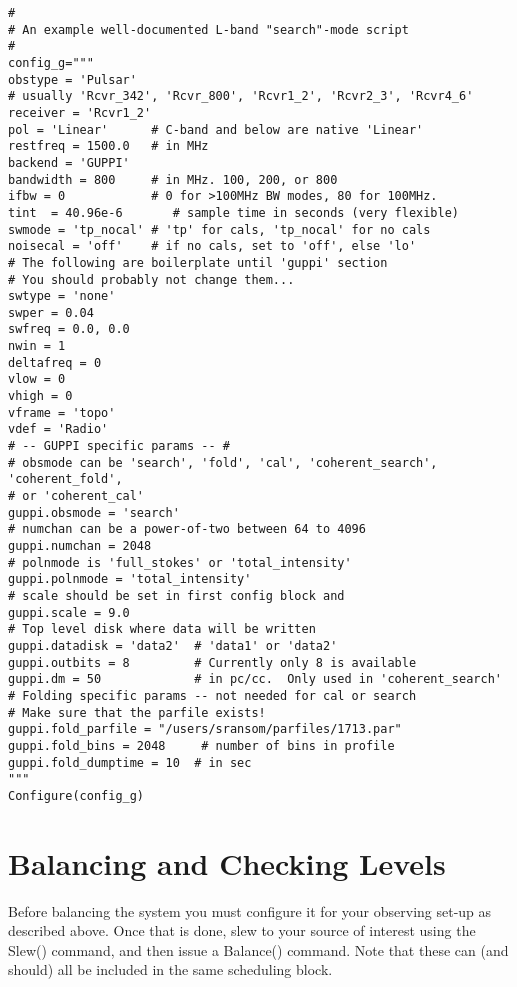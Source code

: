 \begin{lstlisting}
#
# An example well-documented L-band "search"-mode script
#
config_g="""
obstype = 'Pulsar'
# usually 'Rcvr_342', 'Rcvr_800', 'Rcvr1_2', 'Rcvr2_3', 'Rcvr4_6'
receiver = 'Rcvr1_2'
pol = 'Linear'      # C-band and below are native 'Linear'
restfreq = 1500.0   # in MHz
backend = 'GUPPI'
bandwidth = 800     # in MHz. 100, 200, or 800
ifbw = 0            # 0 for >100MHz BW modes, 80 for 100MHz.
tint  = 40.96e-6       # sample time in seconds (very flexible)
swmode = 'tp_nocal' # 'tp' for cals, 'tp_nocal' for no cals
noisecal = 'off'    # if no cals, set to 'off', else 'lo'
# The following are boilerplate until 'guppi' section
# You should probably not change them...
swtype = 'none'
swper = 0.04
swfreq = 0.0, 0.0
nwin = 1
deltafreq = 0
vlow = 0
vhigh = 0
vframe = 'topo'
vdef = 'Radio'
# -- GUPPI specific params -- #
# obsmode can be 'search', 'fold', 'cal', 'coherent_search', 'coherent_fold',
# or 'coherent_cal'
guppi.obsmode = 'search'
# numchan can be a power-of-two between 64 to 4096
guppi.numchan = 2048
# polnmode is 'full_stokes' or 'total_intensity'
guppi.polnmode = 'total_intensity'
# scale should be set in first config block and
guppi.scale = 9.0
# Top level disk where data will be written
guppi.datadisk = 'data2'  # 'data1' or 'data2'
guppi.outbits = 8         # Currently only 8 is available
guppi.dm = 50             # in pc/cc.  Only used in 'coherent_search'
# Folding specific params -- not needed for cal or search
# Make sure that the parfile exists!
guppi.fold_parfile = "/users/sransom/parfiles/1713.par"
guppi.fold_bins = 2048     # number of bins in profile
guppi.fold_dumptime = 10  # in sec
"""
Configure(config_g)

\end{lstlisting}

\section{Balancing and Checking Levels}
\label{sec:levels}
Before balancing the system you must configure it for your observing
set-up as described above.  Once that is done, slew to your source of
interest using the Slew() command, and then issue a Balance() command.
Note that these can (and should) all be included in the same
scheduling block.

